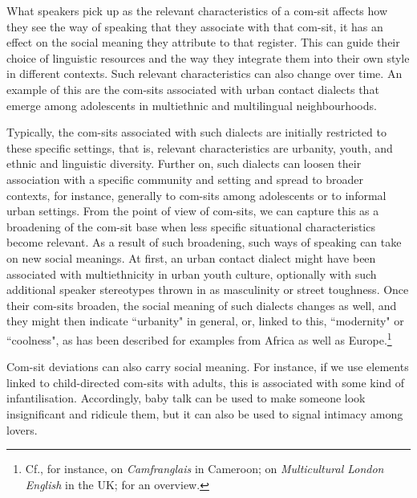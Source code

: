 What speakers pick up as the relevant characteristics of a com-sit affects how they see the way of speaking that they associate with that com-sit, it has an effect on the social meaning they attribute to that register. This can guide their choice of linguistic resources and the way they integrate them into their own style in different contexts. Such relevant characteristics can also change over time. An example of this are the com-sits associated with urban contact dialects that emerge among adolescents in multiethnic and multilingual neighbourhoods.

Typically, the com-sits associated with such dialects are initially restricted to these specific settings, that is, relevant characteristics are urbanity, youth, and ethnic and linguistic diversity. Further on, such dialects can loosen their association with a specific community and setting and spread to broader contexts, for instance, generally to com-sits among adolescents or to informal urban settings. From the point of view of com-sits, we can capture this as a broadening of the com-sit base when less specific situational characteristics become relevant. As a result of such broadening, such ways of speaking can take on new social meanings. At first, an urban contact dialect might have been associated with multiethnicity in urban youth culture, optionally with such additional speaker stereotypes thrown in as masculinity or street toughness. Once their com-sits broaden, the social meaning of such dialects changes as well, and they might then indicate “urbanity" in general, or, linked to this, “modernity" or “coolness", as has been described for examples from Africa as well as Europe.\footnote{Cf., for instance, \citet{Kießling2005} on \textit{Camfranglais} in Cameroon; \citet{Kerswill2014} on \textit{Multicultural London English} in the UK; \citet{Wiese2022} for an overview.}

Com-sit deviations can also carry social meaning. For instance, if we use elements linked to child-directed com-sits with adults, this is associated with some kind of infantilisation. Accordingly, baby talk can be used to make someone look insignificant and ridicule them, but it can also be used to signal intimacy among lovers.


